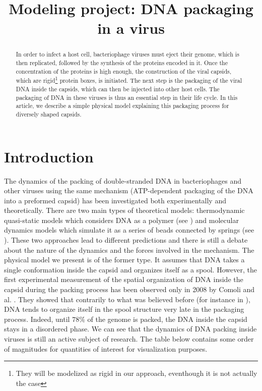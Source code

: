 \documentclass{article}
\title{Modeling project: DNA packaging in a virus}
\author{}
\date{}
\begin{document}
\maketitle

\begin{abstract}
\noindent
In order to infect a host cell, bacteriophage viruses must eject their genome, which is then replicated, followed by the synthesis of the proteins encoded in it. Once the concentration of the proteins is high enough, the construction of the viral capsids, which are rigid\footnote{They will  be modelized as rigid in our approach, eventhough it is not actually the case} protein boxes, is initiated. The next step is the packaging of the viral DNA inside the capsids, which can then be injected into other host cells. The packaging of DNA in these viruses is thus an essential step in their life cycle. In this article, we describe a simple physical model explaining this packaging process for diversely shaped capsids. 
\end{abstract}


\section{Introduction}
The dynamics of the packing of double-stranded DNA in bacteriophages and other viruses using the same mechanism (ATP-dependent packaging of the DNA into a preformed capsid) has been investigated both experimentally and theoretically. There are two main types of theoretical models: thermodynamic quasi-static models which considers DNA as a polymer (see \cite{phillips2005}) and molecular dynamics models which simulate it as a series of beads connected by springs (see \cite{Petrov2008}). These two approaches lead to different predictions and there is still a debate about the nature of the dynamics and the forces involved in the mechanism.\cite{Berndsen2014} The physical model we present is of the former type. It assumes that DNA takes a single conformation inside the capsid and organizes itself as a spool. However, the first experimental measurement of the spatial organization of DNA inside the capsid during the packing process has been observed only in 2008 by Comoli and al. \cite{comoli2008}. They showed that contrarily to what was believed before (for instance in \cite{phillips2005, purohit2003}), DNA tends to organize itself in the spool structure very late in the packaging process. Indeed, until $78\%$ of the genome is packed, the DNA inside the capsid stays in a disordered phase. We can see that the dynamics of DNA packing inside viruses is still an active subject of research. The table below contains some order of magnitudes for quantities of interest for visualization purposes.
\end{document}

